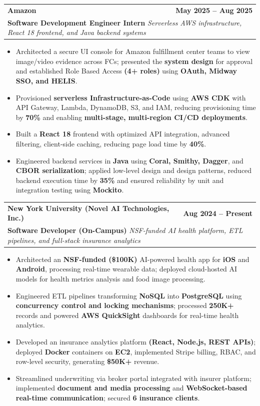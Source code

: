\documentclass[letterpaper,10pt]{article}
\makeatletter
\newcommand{\resumeItem}[1]{
\item\small{{#1}\vspace{-3.5pt}}
}
\newcommand{\resumeSubheading}[4]{
\vspace{6pt}
\item
\begin{tabular*}{1.0\textwidth}[t]{l@{\extracolsep{\fill}}r}
\textbf{#1} & \textbf{\small #2} \\
\multicolumn{2}{l}{\textbf{\small#3} \textbar{} \textit{\small #4}} \\
\end{tabular*}\vspace{-5.5pt}
}
\newcommand{\resumeItemListStart}{\begin{itemize}[leftmargin=*, itemsep=0pt, topsep=0pt]}
\newcommand{\resumeItemListEnd}{\end{itemize}\vspace{-3pt}}
\makeatother
\begin{document}
\resumeSubheading
  {Amazon}{May 2025 -- Aug 2025}
  {Software Development Engineer Intern}{Serverless AWS infrastructure, React 18 frontend, and Java backend systems}
\resumeItemListStart
  \resumeItem{Architected a secure UI console for Amazon fulfillment center teams to view image/video evidence across FCs; presented the \textbf{system design} for approval and established Role Based Access \textbf{(4+ roles)} using \textbf{OAuth, Midway SSO, and HELIS}.}
  \resumeItem{Provisioned \textbf{serverless Infrastructure-as-Code} using \textbf{AWS CDK} with API Gateway, Lambda, DynamoDB, S3, and IAM, reducing provisioning time by \textbf{70\%} and enabling \textbf{multi-stage, multi-region CI/CD deployments}.}
  \resumeItem{Built a \textbf{React 18} frontend with optimized API integration, advanced filtering, client-side caching, reducing page load time by \textbf{40\%}.}
  \resumeItem{Engineered backend services in \textbf{Java} using \textbf{Coral, Smithy, Dagger}, and \textbf{CBOR serialization}; applied low-level design and design patterns, reduced backend execution time by \textbf{35\%} and ensured reliability by unit and integration testing using \textbf{Mockito}.}
\resumeItemListEnd

\resumeSubheading
  {New York University (Novel AI Technologies, Inc.)}{Aug 2024 -- Present}
  {Software Developer (On-Campus)}{NSF-funded AI health platform, ETL pipelines, and full-stack insurance analytics}
\resumeItemListStart
  \resumeItem{Architected an \textbf{NSF-funded (\$100K)} AI-powered health app for \textbf{iOS} and \textbf{Android}, processing real-time wearable data; deployed cloud-hosted AI models for health metrics analysis and food image processing.}
  \resumeItem{Engineered ETL pipelines transforming \textbf{NoSQL} into \textbf{PostgreSQL} using \textbf{concurrency control and locking mechanisms}; processed \textbf{250K+} records and powered \textbf{AWS QuickSight} dashboards for real-time health analytics.}
  \resumeItem{Developed an insurance analytics platform \textbf{(React, Node.js, REST APIs)}; deployed \textbf{Docker} containers on \textbf{EC2}, implemented Stripe billing, RBAC, and row-level security, generating \textbf{\$50K+} revenue.}
  \resumeItem{Streamlined underwriting via broker portal integrated with insurer platform; implemented \textbf{document and media processing} and \textbf{WebSocket-based real-time communication}; secured \textbf{6 insurance clients}.}
\resumeItemListEnd
\end{document}
